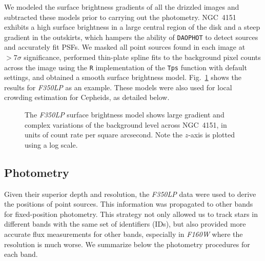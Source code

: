 \documentclass[twocolumn]{aastex63}
\renewcommand{\ng}{NGC\ 4151 }
\newcommand{\ngs}{NGC\ 4151}
\newcommand{\hstw}{{\it F350LP} }
\newcommand{\hsth}{{\it F160W} }
\newcommand{\hstws}{{\it F350LP}}
\newcommand{\hstvs}{{\it F555W}}
\newcommand{\hstis}{{\it F814W}}
\begin{document}
\begin{figure*}
\caption{Color image of \ngs\ using our master frames in \hstws, \hstvs, \hstis, and \hsth as the luminance layer and the blue, green, and red channels, respectively. A square-root scaling was applied to all layers to increase visibility of the outer disk. Color is only shown where all layers overlap, while grayscale is used in areas not covered in \hsth.\label{fig_cc}}
\end{figure*}

We modeled the surface brightness gradients of all the drizzled images and subtracted these models prior to carrying out the photometry. \ng exhibits a high surface brightness in a large central region of the disk and a steep gradient in the outskirts, which hampers the ability of {\tt DAOPHOT} to detect sources and accurately fit PSFs. We masked all point sources found in each image at $>7\sigma$ significance, performed thin-plate spline fits to the background pixel counts across the image using the {\tt R} implementation of the {\tt Tps} function with default settings, and obtained a smooth surface brightness model. Fig.~\ref{fig_sbf} shows the results for \hstw as an example. These models were also used for local crowding estimation for Cepheids, as detailed below.

\begin{figure}
\caption{The \hstw surface brightness model shows large gradient and complex variations of the background level across \ngs, in units of count rate per square arcsecond. Note the $z$-axis is plotted using a log scale.\label{fig_sbf}}
\end{figure}

\subsection{Photometry}\label{sec_phot}

Given their superior depth and resolution, the \hstw data were used to derive the positions of point sources. This information was propagated to other bands for fixed-position photometry. This strategy not only allowed us to track stars in different bands with the same set of identifiers (IDs), but also provided more accurate flux measurements for other bands, especially in \hsth where the resolution is much worse. We summarize below the photometry procedures for each band.
\end{document}
